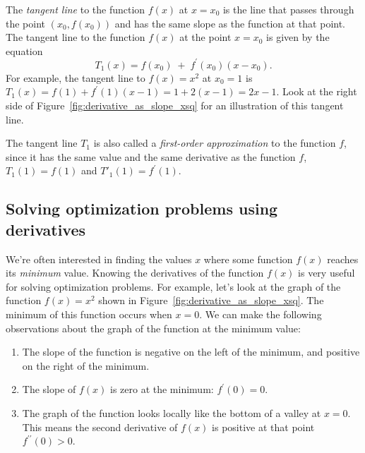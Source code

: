 			The \emph{tangent line} to the function $f(x)$ at $x=x_0$ is
			the line that passes through the point $(x_0, f(x_0))$
			and has  the same slope as the function at that point.
			The tangent line to the function $f(x)$
			at the point $x=x_0$ is given by the equation
			\[
				T_1(x) =  f(x_0) \; + \;  f^{\prime\!}(x_0)(x-x_0).
			\]
			For example,
			the tangent line to $f(x)=x^2$ at $x_0=1$
			is $T_1(x) = f(1)  +  f^{\prime\!}(1)(x-1) = 1 + 2(x-1) = 2x - 1$.
			Look at the right side of Figure~\ref{fig:derivative_as_slope_xsq}
			for an illustration of this tangent line.

			The tangent line $T_1$ is also called a \emph{first-order approximation} to the function $f$,
			since it has the same value and the same derivative as the function $f$,
			$T_1(1) = f(1)$ and $T'_1(1) = f^{\prime\!}(1)$.


	\subsection{Solving optimization problems using derivatives}
	\label{derivatives:optimization}
		
		We're often interested in finding the values $x$ where some function $f(x)$
		reaches its \emph{minimum} value.
		Knowing the derivatives of the function $f(x)$
		is very useful for solving optimization problems.
		For example,
		let's look at the graph of the function $f(x)=x^2$
		shown in Figure~\ref{fig:derivative_as_slope_xsq}.
		The minimum of this function occurs when $x=0$.
		We can make the following observations about the graph of the function at the minimum value:

		\begin{enumerate}

			\item[(A)] 	The slope of the function is negative on the left of the minimum,
					and positive on the right of the minimum.

			\item[(B)]	The slope of $f(x)$ is zero at the minimum: $f^{\prime\!}(0) = 0$.

			\item[(C)]	The graph of the function looks locally like the bottom of a valley at $x=0$.
					This means the second derivative of $f(x)$
					is positive at that point $f^{\prime\prime\!}(0) > 0$.
			
		\end{enumerate}

